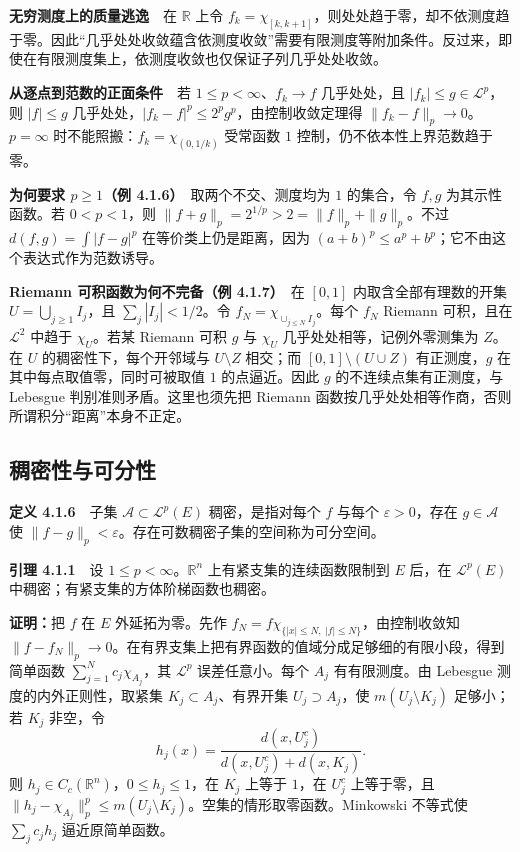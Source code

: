 \documentclass[11pt,a4paper]{article}
\begin{document}
\textbf{无穷测度上的质量逃逸}　在 \(\mathbb R\) 上令
\(f_k=\chi_{[k,k+1]}\)，则处处趋于零，却不依测度趋于零。因此``几乎处处收敛蕴含依测度收敛''需要有限测度等附加条件。反过来，即使在有限测度集上，依测度收敛也仅保证子列几乎处处收敛。

\textbf{从逐点到范数的正面条件}　若 \(1\le p<\infty\)、\(f_k\to f\)
几乎处处，且 \(|f_k|\le g\in\mathcal L^p\)，则 \(|f|\le g\)
几乎处处，\(|f_k-f|^p\le2^pg^p\)，由控制收敛定理得
\(\|f_k-f\|_p\to0\)。\(p=\infty\) 时不能照搬：\(f_k=\chi_{(0,1/k)}\)
受常函数 \(1\) 控制，仍不依本性上界范数趋于零。

\textbf{为何要求 \(p\ge1\)（例 4.1.6）}　取两个不交、测度均为 \(1\)
的集合，令 \(f,g\) 为其示性函数。若 \(0<p<1\)，则
\(\|f+g\|_p=2^{1/p}>2=\|f\|_p+\|g\|_p\)。不过 \(d(f,g)=\int|f-g|^p\)
在等价类上仍是距离，因为
\((a+b)^p\le a^p+b^p\)；它不由这个表达式作为范数诱导。

\textbf{Riemann 可积函数为何不完备（例 4.1.7）}　在 \([0,1]\)
内取含全部有理数的开集 \(U=\bigcup_{j\ge1}I_j\)，且
\(\sum_j|I_j|<1/2\)。令 \(f_N=\chi_{\cup_{j\le N}I_j}\)。每个 \(f_N\)
Riemann 可积，且在 \(\mathcal L^2\) 中趋于 \(\chi_U\)。若某 Riemann 可积
\(g\) 与 \(\chi_U\) 几乎处处相等，记例外零测集为 \(Z\)。在 \(U\)
的稠密性下，每个开邻域与 \(U\setminus Z\) 相交；而
\([0,1]\setminus(U\cup Z)\) 有正测度，\(g\)
在其中每点取值零，同时可被取值 \(1\) 的点逼近。因此 \(g\)
的不连续点集有正测度，与 Lebesgue 判别准则矛盾。这里也须先把 Riemann
函数按几乎处处相等作商，否则所谓积分``距离''本身不正定。

\subsection{稠密性与可分性}\label{ch04-s1-ux7a20ux5bc6ux6027ux4e0eux53efux5206ux6027}

\textbf{定义 4.1.6}　子集 \(\mathcal A\subset\mathcal L^p(E)\)
稠密，是指对每个 \(f\) 与每个 \(\varepsilon>0\)，存在 \(g\in\mathcal A\)
使 \(\|f-g\|_p<\varepsilon\)。存在可数稠密子集的空间称为可分空间。

\textbf{引理 4.1.1}　设 \(1\le p<\infty\)。\(\mathbb R^n\)
上有紧支集的连续函数限制到 \(E\) 后，在 \(\mathcal L^p(E)\)
中稠密；有紧支集的方体阶梯函数也稠密。

\textbf{证明：}把 \(f\) 在 \(E\) 外延拓为零。先作
\(f_N=f\chi_{\{|x|\le N,\ |f|\le N\}}\)，由控制收敛知
\(\|f-f_N\|_p\to0\)。在有界支集上把有界函数的值域分成足够细的有限小段，得到简单函数
\(\sum_{j=1}^Nc_j\chi_{A_j}\)，其 \(\mathcal L^p\) 误差任意小。每个
\(A_j\) 有有限测度。由 Lebesgue 测度的内外正则性，取紧集
\(K_j\subset A_j\)、有界开集 \(U_j\supset A_j\)，使
\(m(U_j\setminus K_j)\) 足够小；若 \(K_j\) 非空，令 \[
h_j(x)=\frac{d(x,U_j^c)}{d(x,U_j^c)+d(x,K_j)}.
\] 则 \(h_j\in C_c(\mathbb R^n)\)，\(0\le h_j\le1\)，在 \(K_j\) 上等于
\(1\)，在 \(U_j^c\) 上等于零，且
\(\|h_j-\chi_{A_j}\|_p^p\le m(U_j\setminus K_j)\)。空集的情形取零函数。Minkowski
不等式使 \(\sum_jc_jh_j\) 逼近原简单函数。
\end{document}
